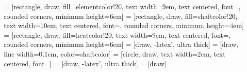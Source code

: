 \documentclass[landscape]{article}
\begin{document}
\pagestyle{empty}



 = [rectangle, draw, fill=elementcolor!20,
text width=9em, text centered, font=\LARGE, rounded corners, minimum height=6em]
 = [rectangle, draw, fill=shaftcolor!20,
text width=10em, text centered, font=\LARGE, rounded corners, minimum height=4em]
 = [rectangle, draw, fill=heatcolor!20,
text width=9em, text centered, font=\LARGE, rounded corners, minimum height=6em]
 = [draw, -latex', ultra thick]
 = [draw, line width=0.1cm, color=shaftcolor]
 = [circle, draw, text width=2em, text centered, font=\LARGE]
 = [draw, -latex', ultra thick]
 = [draw]
\end{document}
